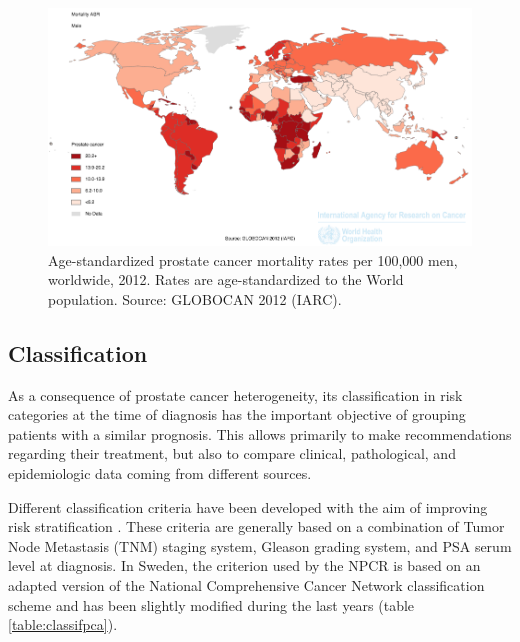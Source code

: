 \begin{figure}
\begin{center}
\includegraphics[width=\linewidth]{figures/mortalitypca.png}
\end{center}
\caption[Age-standardized prostate cancer mortality rates per 100,000 men, worldwide, 2012]{Age-standardized prostate cancer mortality rates per 100,000 men, worldwide, 2012. Rates are age-standardized to the World population. Source: GLOBOCAN 2012 (IARC).}
\label{fig:worldmorpca}
\end{figure}

\subsection{Classification}
\label{section:classification}
As a consequence of prostate cancer heterogeneity, its classification in risk categories at the time of diagnosis has the important objective of grouping patients with a similar prognosis. This allows primarily to make recommendations regarding their treatment, but also to compare clinical, pathological, and epidemiologic data coming from different sources. 

Different classification criteria have been developed with the aim of improving risk stratification \citep{cooperberg_university_2005, boorjian_mayo_2008, heidenreich_eau_2014, mohler_prostate_2014}. These criteria are generally based on a combination of Tumor Node Metastasis (TNM) staging system, Gleason grading system, and PSA serum level at diagnosis. In Sweden, the criterion used by the NPCR  is based on an adapted version of the National Comprehensive Cancer Network classification scheme and has been slightly modified during the last years \citep{npcr_prostatacancer_2013} (table \ref{table:classifpca}).


